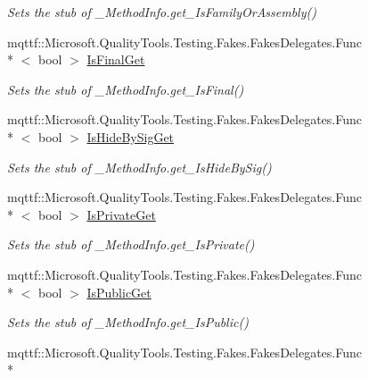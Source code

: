 \begin{DoxyCompactItemize}
\begin{DoxyCompactList}\small\item\em Sets the stub of \-\_\-\-Method\-Info.\-get\-\_\-\-Is\-Family\-Or\-Assembly()\end{DoxyCompactList}\item 
mqttf\-::\-Microsoft.\-Quality\-Tools.\-Testing.\-Fakes.\-Fakes\-Delegates.\-Func\\*
$<$ bool $>$ \hyperlink{class_system_1_1_runtime_1_1_interop_services_1_1_fakes_1_1_stub___method_info_adfb2c60ca6cc7bb7446324fc7b78a79f}{Is\-Final\-Get}
\begin{DoxyCompactList}\small\item\em Sets the stub of \-\_\-\-Method\-Info.\-get\-\_\-\-Is\-Final()\end{DoxyCompactList}\item 
mqttf\-::\-Microsoft.\-Quality\-Tools.\-Testing.\-Fakes.\-Fakes\-Delegates.\-Func\\*
$<$ bool $>$ \hyperlink{class_system_1_1_runtime_1_1_interop_services_1_1_fakes_1_1_stub___method_info_a05db0017c31508bd1a5597a58ee26f37}{Is\-Hide\-By\-Sig\-Get}
\begin{DoxyCompactList}\small\item\em Sets the stub of \-\_\-\-Method\-Info.\-get\-\_\-\-Is\-Hide\-By\-Sig()\end{DoxyCompactList}\item 
mqttf\-::\-Microsoft.\-Quality\-Tools.\-Testing.\-Fakes.\-Fakes\-Delegates.\-Func\\*
$<$ bool $>$ \hyperlink{class_system_1_1_runtime_1_1_interop_services_1_1_fakes_1_1_stub___method_info_a51e0fd4b47f9571f73a0a3976ee114c6}{Is\-Private\-Get}
\begin{DoxyCompactList}\small\item\em Sets the stub of \-\_\-\-Method\-Info.\-get\-\_\-\-Is\-Private()\end{DoxyCompactList}\item 
mqttf\-::\-Microsoft.\-Quality\-Tools.\-Testing.\-Fakes.\-Fakes\-Delegates.\-Func\\*
$<$ bool $>$ \hyperlink{class_system_1_1_runtime_1_1_interop_services_1_1_fakes_1_1_stub___method_info_a5c17ec9f509042172a4515d3386864d9}{Is\-Public\-Get}
\begin{DoxyCompactList}\small\item\em Sets the stub of \-\_\-\-Method\-Info.\-get\-\_\-\-Is\-Public()\end{DoxyCompactList}\item 
mqttf\-::\-Microsoft.\-Quality\-Tools.\-Testing.\-Fakes.\-Fakes\-Delegates.\-Func\\*

\end{DoxyCompactItemize}
